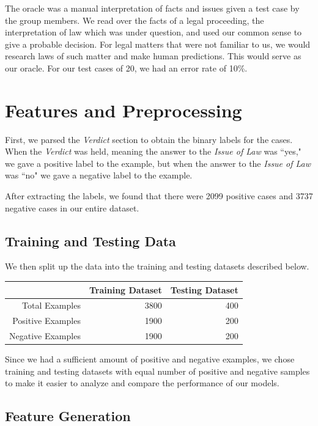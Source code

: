 \documentclass[journal]{IEEEtran}
\begin{document}
The oracle was a manual interpretation of facts and issues given a test case by the group members. We read over the facts of a legal proceeding, the interpretation of law which was under question, and used our common sense to give a probable decision. For legal matters that were not familiar to us, we would research laws of such matter and make human predictions. This would serve as our oracle. For our test cases of 20, we had an error rate of 10\%. 

\section{Features and Preprocessing}

First, we parsed the \textit{Verdict} section to obtain the binary labels for the cases. When the \textit{Verdict} was held, meaning the answer to the \textit{Issue of Law} was ``yes," we gave a positive label to the example, but when the answer to the \textit{Issue of Law} was ``no" we gave a negative label to the example. 

After extracting the labels, we found that there were 2099 positive cases and 3737 negative cases in our entire dataset.

\subsection{Training and Testing Data}

We then split up the data into the training and testing datasets described below.

\begin{table}[ht]
\centering
\begin{tabular}{rrr}
  \hline
& Training Dataset &	Testing Dataset\\
  \hline
Total Examples&	3800&	400 \\
Positive Examples &	1900 &	200 \\
Negative Examples &	1900 &	200 \\
   \hline
\end{tabular}
\end{table}

Since we had a sufficient amount of positive and negative examples, we chose training and testing datasets with equal number of positive and negative samples to make it easier to analyze and compare the performance of our models.

\subsection{Feature Generation}
\end{document}
